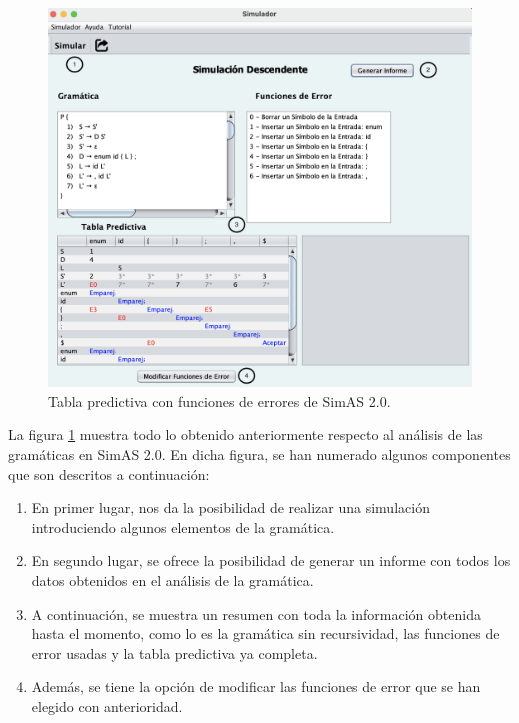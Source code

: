 \begin{figure}[htp]
 	\begin{center}
      \includegraphics[scale=0.5]{figuras/Cap3/SimAS2/finalizar.png} 
       \caption{Tabla predictiva con funciones de errores de SimAS 2.0.}\label{fig:SimAS-2.0-finalizar}
 	\end{center}
\end{figure}

\newpage
La figura \ref{fig:SimAS-2.0-finalizar} muestra todo lo obtenido anteriormente respecto al análisis de las gramáticas en SimAS 2.0. En dicha figura, se han numerado algunos componentes que son descritos a continuación:
 \begin{enumerate}
     \item En primer lugar, nos da la posibilidad de realizar una simulación introduciendo algunos elementos de la gramática.
     \item En segundo lugar, se ofrece la posibilidad de generar un informe con todos los datos obtenidos en el análisis de la gramática.
     \item A continuación, se muestra un resumen con toda la información obtenida hasta el momento, como lo es la gramática sin recursividad, las funciones de error usadas y la tabla predictiva ya completa.
     \item Además, se tiene la opción de modificar las funciones de error que se han elegido con anterioridad.
 \end{enumerate}


